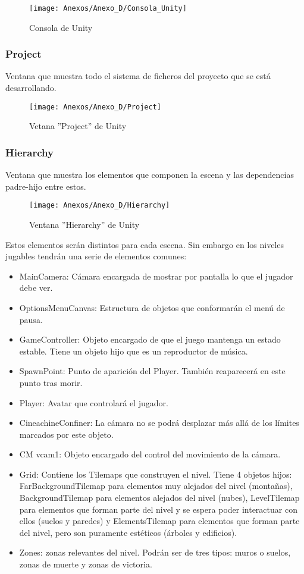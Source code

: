 \clearpage
\begin{figure}[h]
\centering
\texttt{[image: Anexos/Anexo\_D/Consola\_Unity]}
\caption{Consola de Unity}
\end{figure}

\subsubsection{Project}
Ventana que muestra todo el sistema de ficheros del proyecto que se está desarrollando.

\begin{figure}[h]
\centering
\texttt{[image: Anexos/Anexo\_D/Project]}
\caption{Vetana ''Project'' de Unity}
\end{figure}
\clearpage

\subsubsection{Hierarchy}
Ventana que muestra los elementos que componen la escena y las dependencias padre-hijo entre estos.

\begin{figure}[h]
\centering
\texttt{[image: Anexos/Anexo\_D/Hierarchy]}
\caption{Ventana ''Hierarchy'' de Unity}
\end{figure}

Estos elementos serán distintos para cada escena. Sin embargo en los niveles jugables tendrán una serie de elementos comunes:
\begin{itemize}
\item
MainCamera: Cámara encargada de mostrar por pantalla lo que el jugador debe ver.
\item
OptionsMenuCanvas: Estructura de objetos que conformarán el menú de pausa.
\item
GameController: Objeto encargado de que el juego mantenga un estado estable. Tiene un objeto hijo que es un reproductor de música.
\item
SpawnPoint: Punto de aparición del Player. También reaparecerá en este punto tras morir.
\item
Player: Avatar que controlará el jugador.
\item
CineachineConfiner: La cámara no se podrá desplazar más allá de los límites marcados por este objeto.
\item
CM vcam1: Objeto encargado del control del movimiento de la cámara.
\item
Grid: Contiene los Tilemaps que construyen el nivel. Tiene 4 objetos hijos: FarBackgroundTilemap para elementos muy alejados del nivel (montañas), BackgroundTilemap para elementos alejados del nivel (nubes), LevelTilemap para elementos que forman parte del nivel y se espera poder interactuar con ellos (suelos y paredes) y ElementsTilemap para elementos que forman parte del nivel, pero son puramente estéticos (árboles y edificios).
\item
Zones: zonas relevantes del nivel. Podrán ser de tres tipos: muros o suelos, zonas de muerte y zonas de victoria.
\end{itemize}

